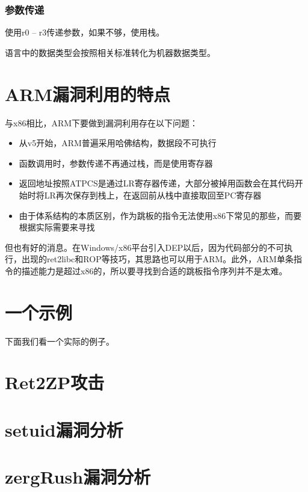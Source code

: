 \subsubsection{参数传递}

使用r0 – r3传递参数，如果不够，使用栈。

语言中的数据类型会按照相关标准转化为机器数据类型。
\section{ARM漏洞利用的特点}
与x86相比，ARM下要做到漏洞利用存在以下问题：
\begin{itemize}
\item 从v5开始，ARM普遍采用哈佛结构，数据段不可执行
\item 函数调用时，参数传递不再通过栈，而是使用寄存器
\item 返回地址按照ATPCS是通过LR寄存器传递，大部分被掉用函数会在其代码开始时将LR再次保存到栈上，在返回前从栈中直接取回至PC寄存器
\item 由于体系结构的本质区别，作为跳板的指令无法使用x86下常见的那些，而要根据实际需要来寻找
\end{itemize}
但也有好的消息。在Windows/x86平台引入DEP以后，因为代码部分的不可执行，出现的ret2libc和ROP等技巧，其思路也可以用于ARM。此外，ARM单条指令的描述能力是超过x86的，所以要寻找到合适的跳板指令序列并不是太难。
\section{一个示例}
下面我们看一个实际的例子。
\section{Ret2ZP攻击}
\section{setuid漏洞分析}
\section{zergRush漏洞分析}
